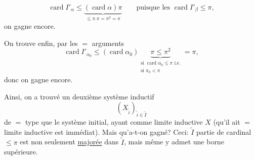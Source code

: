 \[
\operatorname{card}I'_\alpha\leq
\underbrace{(\operatorname{card}\alpha)\pi}_{\leq\pi.\pi=\pi^2=\pi}
\qquad\text{puisque les }\operatorname{card}I'_\beta\leq\pi,
\]
on gagne encore.

On trouve enfin, par les $=$ arguments
\[
\operatorname{card}I'_{\alpha_0}\leq(\operatorname{card}\alpha_0)
\underbrace{\pi\leq\pi^2}_{\substack{\text{si }\operatorname{card}\alpha_0\leq\pi\text{ i.e.}\\\text{si }\pi_0<\pi}}=\pi,
\]
donc on gagne encore.

Ainsi, on a trouvé un deuxième système inductif
\[
(X_{\widetilde i})_{\widetilde i\in\widetilde I}
\]
de $=$ type que le système initial, ayant comme limite inductive $X$ (qu'il ait $=$ limite inductive est immédiat). Mais qu'a-t-on gagné? Ceci:   $\widetilde I$   partie  de cardinal $\leq\pi$ est non seulement \uline{majorée} dans $\widetilde I$, mais même y admet une borne supérieure.
\margin{$\Vert$}
